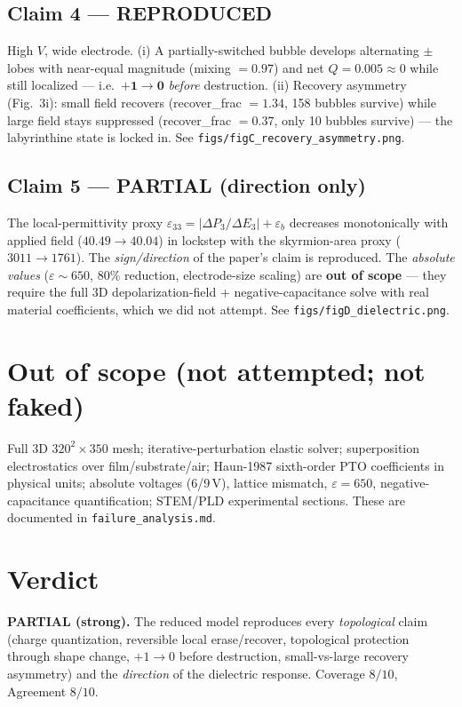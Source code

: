 \documentclass[11pt]{article}
\begin{document}
\subsection*{Claim 4 --- REPRODUCED}
High $V$, wide electrode. (i) A partially-switched bubble develops alternating
$\pm$ lobes with near-equal magnitude (mixing $=0.97$) and net $Q=0.005\approx0$
while still localized --- i.e.\ $\mathbf{+1\to0}$ \emph{before} destruction.
(ii) Recovery asymmetry (Fig.~3i): small field recovers (recover\_frac $=1.34$,
158 bubbles survive) while large field stays suppressed (recover\_frac $=0.37$,
only 10 bubbles survive) --- the labyrinthine state is locked in.
See \texttt{figs/figC\_recovery\_asymmetry.png}.

\subsection*{Claim 5 --- PARTIAL (direction only)}
The local-permittivity proxy $\varepsilon_{33}=|\Delta P_3/\Delta E_3|+\varepsilon_b$
decreases monotonically with applied field ($40.49\to40.04$) in lockstep with the
skyrmion-area proxy ($3011\to1761$). The \emph{sign/direction} of the paper's
claim is reproduced. The \emph{absolute values} ($\varepsilon\sim650$, $80\%$
reduction, electrode-size scaling) are \textbf{out of scope} --- they require the
full 3D depolarization-field + negative-capacitance solve with real material
coefficients, which we did not attempt. See \texttt{figs/figD\_dielectric.png}.

\section{Out of scope (not attempted; not faked)}
Full 3D $320^2\!\times\!350$ mesh; iterative-perturbation elastic solver;
superposition electrostatics over film/substrate/air; Haun-1987 sixth-order PTO
coefficients in physical units; absolute voltages (6/9\,V), lattice mismatch,
$\varepsilon=650$, negative-capacitance quantification; STEM/PLD experimental
sections. These are documented in \texttt{failure\_analysis.md}.

\section{Verdict}
\textbf{PARTIAL (strong).} The reduced model reproduces every \emph{topological}
claim (charge quantization, reversible local erase/recover, topological
protection through shape change, $+1\!\to\!0$ before destruction, small-vs-large
recovery asymmetry) and the \emph{direction} of the dielectric response.
Coverage $8/10$, Agreement $8/10$.
\end{document}
